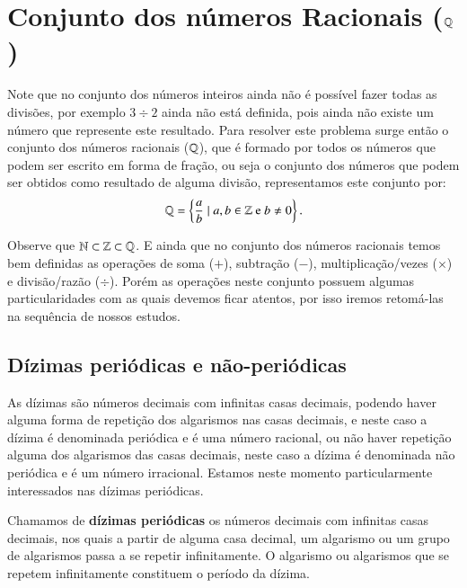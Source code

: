 \section{Conjunto dos números Racionais (\texorpdfstring{$\mathbb{Q}$}{Q})}

Note que no conjunto dos números inteiros ainda não é possível fazer todas as divisões, por exemplo $3 \div 2$ ainda não está definida, pois ainda não existe um número que represente este resultado. Para resolver este problema surge então o conjunto dos números racionais ($\mathbb{Q}$), que é formado por todos os números que podem ser escrito em forma de fração, ou seja o conjunto dos números que podem ser obtidos como resultado de alguma divisão, representamos este conjunto por:
\[\mathbb{Q}= \left\{ \frac{a}{b} \mid a, b \in \mathbb{Z} \text{ e } b \neq 0 \right\}.\]

Observe que $\mathbb{N} \subset \mathbb{Z} \subset \mathbb{Q}$. E ainda que no conjunto dos números racionais temos bem definidas as operações de soma ($+$), subtração ($-$), multiplicação/vezes ($\times$) e divisão/razão ($\div$). Porém as operações neste conjunto possuem algumas particularidades com as quais devemos ficar atentos, por isso iremos retomá-las na sequência de nossos estudos.

\subsection{Dízimas periódicas e não-periódicas}

As dízimas são números decimais com infinitas casas decimais, podendo haver alguma forma de repetição dos algarismos nas casas decimais, e neste caso a dízima é denominada periódica e é uma número racional, ou não haver repetição alguma dos algarismos das casas decimais, neste caso a dízima é denominada não periódica e é um número irracional. Estamos neste momento particularmente interessados nas dízimas periódicas.

 \vskip0.3cm
 \colorbox{azul}{
 \begin{minipage}{0.9\linewidth}
 \begin{center}
  Chamamos de \textbf{dízimas periódicas} os números decimais com infinitas casas decimais, nos quais a partir de alguma casa decimal, um algarismo ou um grupo de algarismos passa a se repetir infinitamente. O algarismo ou algarismos que se repetem infinitamente constituem o período da dízima.
 \end{center}
 \end{minipage}}
 \vskip0.3cm

